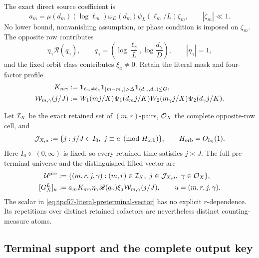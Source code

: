 The exact direct source coefficient is
\begin{equation}
 a_m
 =\mu(d_m)(\log\ell_m)\omega_D(d_m)
   \psi_L(\ell_m/L)\zeta_m,
 \qquad |\zeta_m|\ll1.
 \label{eq:tpc57-source-coefficient}
\end{equation}
No lower bound, nonvanishing assumption, or phase condition is imposed on
\(\zeta_m\).  The opposite row contributes
\begin{equation}
 \eta_\gamma\mathscr R(q_\gamma),
 \qquad
 q_\gamma=
 \left(\log\frac{\ell_\gamma}{L},
       \log\frac{d_\gamma}{D}\right),
 \qquad |\eta_\gamma|=1,
 \label{eq:tpc57-opposite-row-profile}
\end{equation}
and the fixed orbit class contributes \(\xi_a\ne0\).  Retain the literal
mask and four-factor profile
\begin{align}
 K_{m\gamma}
 &:=\one_{\ell_m\ne\ell_\gamma}
    \one_{|m-m_\gamma|>\Delta}
    \one_{(d_m,d_\gamma)\le G},
 \label{eq:tpc57-literal-mask}\\
 \cW_{m,\gamma}(j/J)
 &:=W_1(mj/X)\Psi_1(d_mj/K)
    W_2(m_\gamma j/X)\Psi_2(d_\gamma j/K).
 \label{eq:tpc57-four-factor-profile}
\end{align}

Let \(\mathcal I_X\) be the exact retained set of \((m,r)\)-pairs,
\(\mathcal O_X\) the complete opposite-row cell, and
\begin{equation}
 \mathcal J_{X,a}
 :=\{j:j/J\in I_0,\ j\equiv a\pmod {H_{\rm orb}}\},
 \qquad H_{\rm orb}=O_{h_0}(1).
 \label{eq:tpc57-orbit-set}
\end{equation}
Here \(I_0\Subset(0,\infty)\) is fixed, so every retained time satisfies
\(j\asymp J\).
The full pre-terminal universe and the distinguished lifted vector are
\begin{align}
 \mathcal U^{\rm pre}
 &:=\{(m,r,j,\gamma):(m,r)\in\mathcal I_X,
       \ j\in\mathcal J_{X,a},\ \gamma\in\mathcal O_X\},
 \label{eq:tpc57-preterminal-universe}\\
 [G_X^L]_u
 &:=a_mK_{m\gamma}\eta_\gamma\mathscr R(q_\gamma)\xi_a
    \mathcal W_{m,\gamma}(j/J),
 \qquad u=(m,r,j,\gamma).
 \label{eq:tpc57-literal-preterminal-vector}
\end{align}
The scalar in \eqref{eq:tpc57-literal-preterminal-vector} has no explicit
\(r\)-dependence.  Its repetitions over distinct retained cofactors are
nevertheless distinct counting-measure atoms.

\subsection{Terminal support and the complete output key}

